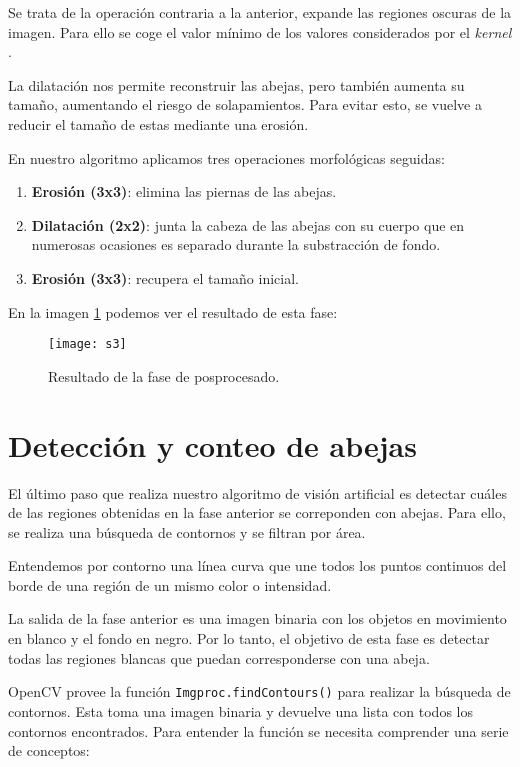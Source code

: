 Se trata de la operación contraria a la anterior, expande las regiones
oscuras de la imagen. Para ello se coge el valor mínimo de los valores
considerados por el \emph{kernel} \citep{book:mastering_opencv}.

La dilatación nos permite reconstruir las abejas, pero también aumenta
su tamaño, aumentando el riesgo de solapamientos. Para evitar esto, se
vuelve a reducir el tamaño de estas mediante una erosión.

En nuestro algoritmo aplicamos tres operaciones morfológicas seguidas:

\begin{enumerate}
\def\labelenumi{\arabic{enumi}.}
\tightlist
\item
  \textbf{Erosión (3x3)}: elimina las piernas de las abejas.
\item
  \textbf{Dilatación (2x2)}: junta la cabeza de las abejas con su cuerpo
  que en numerosas ocasiones es separado durante la substracción de
  fondo.
\item
  \textbf{Erosión (3x3)}: recupera el tamaño inicial.
\end{enumerate}

En la imagen \ref{fig:s3} podemos ver el resultado de esta fase:

\begin{figure}[H]
	\centering
	\texttt{[image: s3]}
	\caption{Resultado de la fase de posprocesado.}
	\label{fig:s3}
\end{figure}

\section{Detección y conteo de abejas}\label{deteccion-y-conteo-de-abejas}

El último paso que realiza nuestro algoritmo de visión artificial es
detectar cuáles de las regiones obtenidas en la fase anterior se
correponden con abejas. Para ello, se realiza una búsqueda de contornos
y se filtran por área.

Entendemos por contorno una línea curva que une todos los puntos
continuos del borde de una región de un mismo color o intensidad.

La salida de la fase anterior es una imagen binaria con los objetos en
movimiento en blanco y el fondo en negro. Por lo tanto, el objetivo de
esta fase es detectar todas las regiones blancas que puedan
corresponderse con una abeja.

OpenCV provee la función \texttt{Imgproc.findContours()} para realizar
la búsqueda de contornos. Esta toma una imagen binaria y devuelve una
lista con todos los contornos encontrados. Para entender la función se
necesita comprender una serie de conceptos: \citep{opencv:contours}

